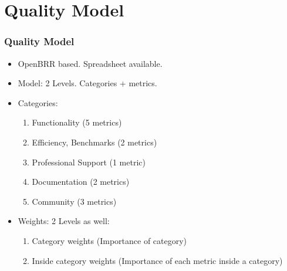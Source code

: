 \section{Quality Model}

\begin{frame}[allowframebreaks]
\frametitle{Quality Model}
\begin{itemize}\itemsep0pt
\item{OpenBRR based.} Spreadsheet available.
\item{Model: 2 Levels.} Categories + metrics.
\item{Categories:}
\begin{enumerate}
	\item Functionality (5 metrics)
	\item Efficiency, Benchmarks (2 metrics)
	\item Professional Support (1 metric)
	\item Documentation (2 metrics)
        \item Community (3 metrics)
\end{enumerate}
\item{Weights: 2 Levels as well}:
\begin{enumerate}
	\item Category weights (Importance of category)
	\item Inside category weights (Importance of each
          metric inside a category)
\end{enumerate}
\end{itemize}

\end{frame}
